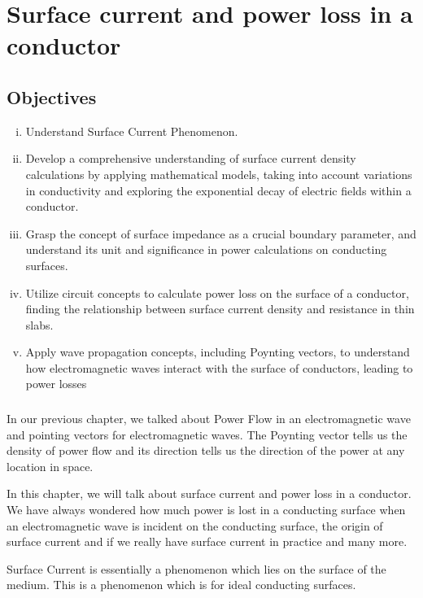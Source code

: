 \chapter{Surface current and power loss in a conductor}\label{lec:lec28}
\begin{mdframed}[backgroundcolor=lightblue, linewidth=1pt,  hidealllines=true]
\section{Objectives}
\begin{enumerate}[(i)]
	\item Understand Surface Current Phenomenon.
	\item Develop a comprehensive understanding of surface current density calculations by applying mathematical models, taking into          account variations in conductivity and exploring the exponential decay of electric fields within a conductor.
	\item Grasp the concept of surface impedance as a crucial boundary parameter, and
	understand its unit and significance in power calculations on conducting
	surfaces.
	\item Utilize circuit concepts to calculate power loss on the surface of a conductor,
	finding the relationship between surface current density and resistance in thin
	slabs.
	\item Apply wave propagation concepts, including Poynting vectors, to understand how electromagnetic waves interact with the surface of conductors, leading to power
	losses
\end{enumerate}
\end{mdframed}
\subsection{}
In our previous chapter, we talked about Power Flow in an electromagnetic wave and pointing vectors for electromagnetic waves. The Poynting vector tells us the density of power flow and its direction tells us the direction of the power at any location in space.

In this chapter, we will talk about surface current and power loss in a conductor. We have always wondered how much power is lost in a conducting surface when an electromagnetic wave is incident on the conducting surface, the origin of surface current and if we really have surface current in practice and many more.

Surface Current is essentially a phenomenon which lies on the surface of the medium. This is a phenomenon which is for ideal conducting surfaces.

